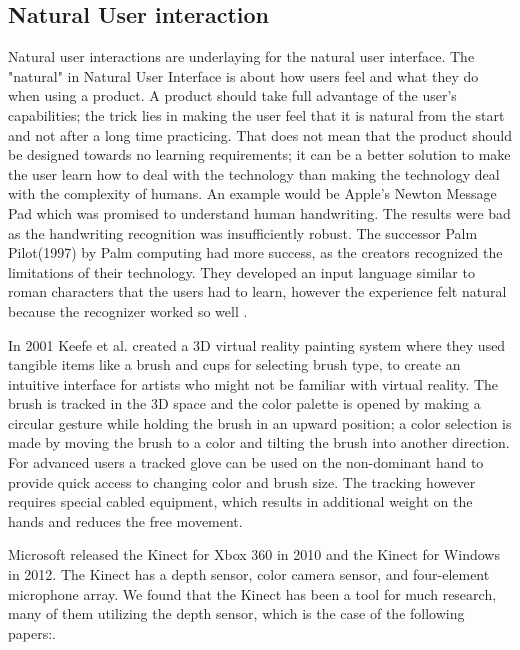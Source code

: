 \subsection{Natural User interaction}
Natural user interactions are underlaying for the natural user interface. The "natural" in Natural User Interface is about how users feel and what they do when using a product. A product should take full advantage of the user's capabilities; the trick lies in making the user feel that it is natural from the start and not after a long time practicing. That does not mean that the product should be designed towards no learning requirements; it can be a better solution to make the user learn how to deal with the technology than making the technology deal with the complexity of humans. An example would be Apple's Newton Message Pad which was promised to understand human handwriting. The results were bad as the handwriting recognition was insufficiently robust. The successor Palm Pilot(1997) by Palm computing had more success, as the creators recognized the limitations of their technology. They developed an input language similar to roman characters that the users had to learn, however the experience felt natural because the recognizer worked so well \cite{Wigdor:2011}.

In 2001 Keefe et al. \cite{Keefe:2001} created a 3D virtual reality painting system where they used tangible items like a brush and cups for selecting brush type, to create an intuitive interface for artists who might not be familiar with virtual reality. The brush is tracked in the 3D space and the color palette is opened by making a circular gesture while holding the brush in an upward position; a color selection is made by moving the brush to a color and tilting the brush into another direction.
For advanced users a tracked glove can be used on the non-dominant hand to provide quick access to changing color and brush size.
The tracking however requires special cabled equipment, which results in additional weight on the hands and reduces the free movement. 

Microsoft released the Kinect for Xbox 360 in 2010\cite{KinectFiction:2010} and the Kinect for Windows in 2012\cite{KinnectPower:2012}. The Kinect has a depth sensor, color camera sensor, and four-element microphone array. We found that the Kinect has been a tool for much research, many of them utilizing the depth sensor, which is the case of the following papers:\cite{Wilson:2010, Aigner:2012, Walter:2014}.

